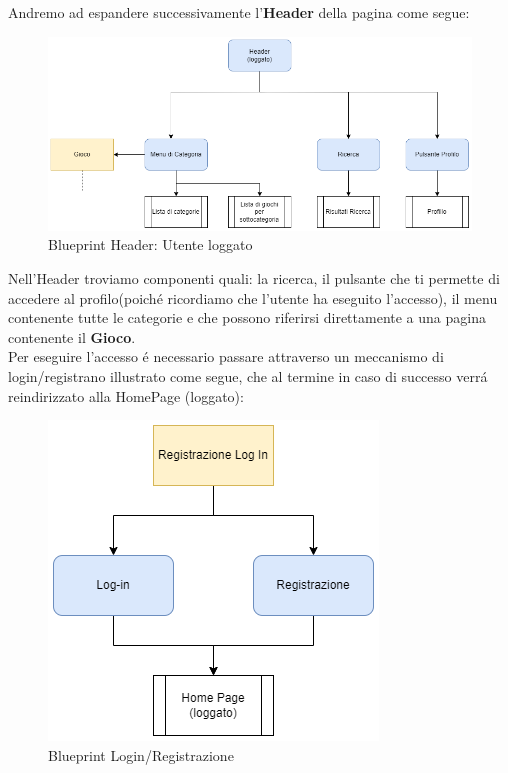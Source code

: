 \documentclass[../Report.tex]{subfiles}
\begin{document}
    Andremo ad espandere successivamente l'\textbf{Header} della pagina come segue:

    \begin{figure}[H]
        \includegraphics[width=\linewidth]{BP_HeaderLog.png}
        \centering
        \caption{Blueprint Header: Utente loggato}
    \end{figure}

    Nell'Header troviamo componenti quali: la ricerca, il pulsante che ti permette di accedere al profilo(poiché ricordiamo che l'utente ha eseguito l'accesso), il menu contenente tutte le categorie e che possono riferirsi direttamente a una pagina contenente il \textbf{Gioco}.\\

    Per eseguire l'accesso é necessario passare attraverso un meccanismo di login/registrano illustrato come segue, che al termine in caso di successo verrá reindirizzato alla HomePage (loggato):

    \begin{figure}[H]
        \includegraphics[width=.6\linewidth]{BP_registrazione login.png}
        \centering
        \caption{Blueprint Login/Registrazione}
    \end{figure}
\end{document}
